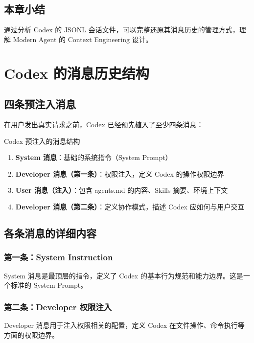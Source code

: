 \documentclass[a4paper]{article}
\begin{document}
\subsection{本章小结}

通过分析 Codex 的 JSONL 会话文件，可以完整还原其消息历史的管理方式，理解 Modern Agent 的 Context Engineering 设计。


\section{Codex 的消息历史结构}

\subsection{四条预注入消息}

在用户发出真实请求之前，Codex 已经预先植入了至少四条消息：

\begin{importantbox}{Codex 预注入的消息结构}
\begin{enumerate}
    \item \textbf{System 消息}：基础的系统指令（System Prompt）
    \item \textbf{Developer 消息（第一条）}：权限注入，定义 Codex 的操作权限边界
    \item \textbf{User 消息（注入）}：包含 agents.md 的内容、Skills 摘要、环境上下文
    \item \textbf{Developer 消息（第二条）}：定义协作模式，描述 Codex 应如何与用户交互
\end{enumerate}
\end{importantbox}

\subsection{各条消息的详细内容}

\subsubsection{第一条：System Instruction}

System 消息是最顶层的指令，定义了 Codex 的基本行为规范和能力边界。这是一个标准的 System Prompt。

\subsubsection{第二条：Developer 权限注入}

Developer 消息用于注入权限相关的配置，定义 Codex 在文件操作、命令执行等方面的权限边界。
\end{document}
